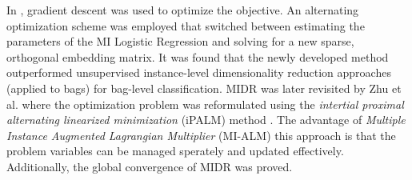 In \citep{Sun2010MIDR}, gradient descent was used to optimize the objective.  An alternating optimization scheme was employed that switched between estimating the parameters of the MI Logistic Regression and solving for a new sparse, orthogonal embedding  matrix.  It was found that the newly developed method outperformed unsupervised instance-level dimensionality reduction approaches (applied to bags) for bag-level classification.  MIDR was later revisited by Zhu et al. where the optimization problem was reformulated using the \textit{intertial proximal alternating linearized minimization} (iPALM) method \citep{Zhu2018MIDRSparsity}.  The advantage of \textit{Multiple Instance Augmented Lagrangian Multiplier} (MI-ALM) this approach is that the problem variables can be managed sperately and updated effectively.  Additionally, the global convergence of MIDR was proved. 

